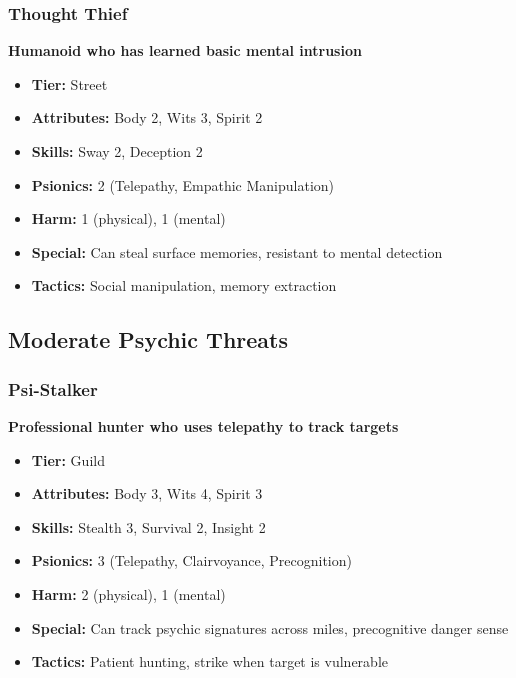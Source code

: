 \documentclass[11pt,twoside]{article}
\begin{document}
\subsubsection{Thought Thief}
\textbf{Humanoid who has learned basic mental intrusion}
\begin{itemize}[leftmargin=*]
    \item \textbf{Tier:} Street
    \item \textbf{Attributes:} Body 2, Wits 3, Spirit 2
    \item \textbf{Skills:} Sway 2, Deception 2
    \item \textbf{Psionics:} 2 (Telepathy, Empathic Manipulation)
    \item \textbf{Harm:} 1 (physical), 1 (mental)
    \item \textbf{Special:} Can steal surface memories, resistant to mental detection
    \item \textbf{Tactics:} Social manipulation, memory extraction
\end{itemize}

\subsection{Moderate Psychic Threats}

\subsubsection{Psi-Stalker}
\textbf{Professional hunter who uses telepathy to track targets}
\begin{itemize}[leftmargin=*]
    \item \textbf{Tier:} Guild
    \item \textbf{Attributes:} Body 3, Wits 4, Spirit 3
    \item \textbf{Skills:} Stealth 3, Survival 2, Insight 2
    \item \textbf{Psionics:} 3 (Telepathy, Clairvoyance, Precognition)
    \item \textbf{Harm:} 2 (physical), 1 (mental)
    \item \textbf{Special:} Can track psychic signatures across miles, precognitive danger sense
    \item \textbf{Tactics:} Patient hunting, strike when target is vulnerable
\end{itemize}
\end{document}

